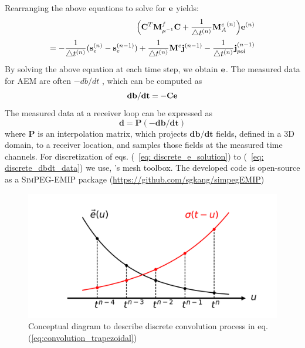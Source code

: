 Rearranging the above equations to solve for ${\mathbf{e} }$ yields:
\begin{align}
  \Big({\mathbf C}^T {{\mathbf M}^f_{\mu^{-1}}} {\mathbf C} + \frac{1}{\triangle t^{(n)}} {{\mathbf M}^e_{A}}^{(n)}\Big) {\mathbf{e} }^{(n)} \nonumber \\
  = - \frac{1}{\triangle t^{(n)}} (\mathbf{s}_e^{(n)}-\mathbf{s}_e^{(n-1)})
    + \frac{1}{\triangle t^{(n)}} {{\mathbf M}^e} {\mathbf{j} }^{(n-1)} - \frac{1}{\triangle t^{(n)}} {\mathbf{j} }_{pol}^{(n-1)}
    \label{eq: discrete_e_solution}
\end{align}
By solving the above equation at each time step, we obtain ${\mathbf{e} }$. The measured data for AEM are often $-db/dt$ , which can be computed as
\begin{equation}
    \mathbf{db/dt} = -{\mathbf C} {\mathbf{e} }
    \label{eq: discrete_dbdt_from_e}
\end{equation}
The measured data at a receiver loop can be expressed as
\begin{equation}
    \mathbf{d} = \mathbf{P} (-\mathbf{db/dt})
    \label{eq: discrete_dbdt_data}
\end{equation}
where $\mathbf{P}$ is an interpolation matrix, which projects $\mathbf{db/dt}$ fields, defined in a 3D domain, to a receiver location, and samples those fields at the measured time channels. For discretization of eqs. (~\ref{eq: discrete_e_solution}) to (~\ref{eq: discrete_dbdt_data}) we use, \SimPEG's mesh toolbox. The developed code is open-source as a \textsc{SimPEG-EMIP} package (\url{https://github.com/sgkang/simpegEMIP})

\begin{figure}[htb]
  \centering
  \includegraphics[width=1.0\textwidth]{figures/convolution_concept.png}
  \caption{Conceptual diagram to describe discrete convolution process in eq. (\ref{eq:convolution_trapezoidal})}
  \label{fig:convolution_concept}
\end{figure}

